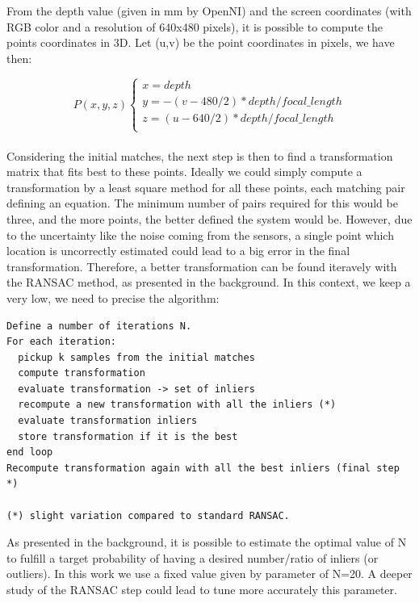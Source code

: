 From the depth value (given in mm by OpenNI) and the screen coordinates (with RGB color and a resolution of 640x480 pixels), it is possible to compute the points coordinates in 3D. Let (u,v) be the point coordinates in pixels, we have then:

\[
P(x,y,z)\left\{
\begin{array}{l}
x = depth \\
y = -(v - 480/2) * depth / focal\_length \\
z = (u - 640/2) * depth / focal\_length \\
\end{array}
\right.
\]

\paragraph{}
Considering the initial matches, the next step is then to find a transformation matrix that fits best to these points. Ideally we could simply compute a transformation by a least square method for all these points, each matching pair defining an equation. The minimum number of pairs required for this would be three, and the more points, the better defined the system would be. However, due to the uncertainty like the noise coming from the sensors, a single point which location is uncorrectly estimated could lead to a big error in the final transformation. Therefore, a better transformation can be found iteravely with the \gls{RANSAC} method, as presented in the background. In this context, we keep a very low, we need to precise the algorithm:

\begin{verbatim}
Define a number of iterations N.
For each iteration:
  pickup k samples from the initial matches 
  compute transformation
  evaluate transformation -> set of inliers
  recompute a new transformation with all the inliers (*)
  evaluate transformation inliers
  store transformation if it is the best
end loop
Recompute transformation again with all the best inliers (final step *)

(*) slight variation compared to standard RANSAC.
\end{verbatim}

As presented in the background, it is possible to estimate the optimal value of N to fulfill a target probability of having a desired number/ratio of inliers (or outliers). In this work we use a fixed value given by parameter of N=20. A deeper study of the \gls{RANSAC} step could lead to tune more accurately this parameter.

